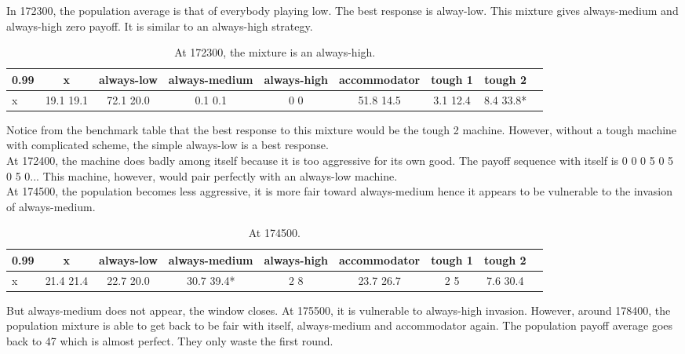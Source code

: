 \documentclass[12.5pt]{report}
\begin{document}
In 172300, the population average is that of everybody playing low. The best response is alway-low. This mixture gives always-medium and always-high zero payoff. It is similar to an always-high strategy. 


\begin{table}[h!]
\center
\begin{tabular}{l|cccccccc}
\textbf{0.99}& x & always-low & always-medium & always-high & accommodator &tough 1 & tough 2\\
\hline
x& 19.1 19.1  &    72.1 20.0    &   0.1 0.1  &        0 0   &      51.8 14.5   &   3.1 12.4  &     8.4 33.8* \\
\end{tabular}
\caption{At 172300, the mixture is an always-high.}
\end{table}

Notice from the benchmark table that the best response to this mixture would be the tough 2 machine. However, without a tough machine with complicated scheme, the simple always-low is a best response.\\

At 172400, the machine does badly among itself because it is too aggressive for its own good. The payoff sequence with itself is 0 0 0 5 0 5 0 5 0... This machine, however, would pair perfectly with an always-low machine.\\

At 174500, the population becomes less aggressive, it is more fair toward always-medium hence it appears to be vulnerable to the invasion of always-medium.
\begin{table}[h!]
\center
\begin{tabular}{l|cccccccc}
\textbf{0.99}& x & always-low & always-medium & always-high & accommodator &tough 1 & tough 2\\
\hline
x&21.4 21.4 &     22.7 20.0  &    30.7 39.4*   &     2 8    &     23.7 26.7 &        2 5    &     7.6 30.4\\ 
\end{tabular}
\caption{At 174500.}
\end{table}
But always-medium does not appear, the window closes. At 175500, it is vulnerable to always-high invasion. However, around 178400, the population mixture is able to get back to be fair with itself, always-medium and accommodator again. The population payoff average goes back to 47 which is almost perfect. They only waste the first round.\\
\end{document}
